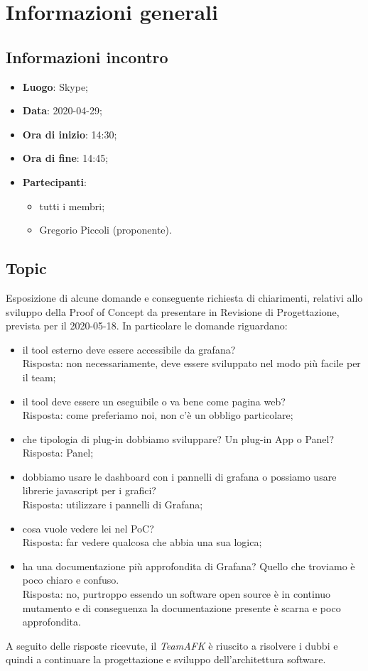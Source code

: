 \section{Informazioni generali}
\subsection{Informazioni incontro}
\begin{itemize}
\item \textbf{Luogo}: Skype;
\item \textbf{Data}: 2020-04-29;
\item \textbf{Ora di inizio}: 14:30;
\item \textbf{Ora di fine}: 14:45;
\item \textbf{Partecipanti}:
	\begin{itemize}
		\item tutti i membri;
		\item Gregorio Piccoli (proponente).
	\end{itemize}
\end{itemize}

\subsection{Topic}
Esposizione di alcune domande e conseguente richiesta di chiarimenti, relativi allo sviluppo della Proof of Concept da presentare in Revisione di Progettazione, prevista per il 2020-05-18.
In particolare le domande riguardano:
\begin{itemize}
	\item il tool esterno deve essere accessibile da grafana?\\
	Risposta: non necessariamente, deve essere sviluppato nel modo più facile per il team;
	\item il tool deve essere un eseguibile o va bene come pagina web? \\
	Risposta: come preferiamo noi, non c'è un obbligo particolare;
	\item che tipologia di plug-in dobbiamo sviluppare? Un plug-in App o Panel? \\
	Risposta: Panel;
	\item dobbiamo usare le dashboard con i pannelli di grafana o possiamo usare librerie javascript per i grafici? \\
	Risposta: utilizzare i pannelli di Grafana;
	\item cosa vuole vedere lei nel PoC? \\
	Risposta: far vedere qualcosa che abbia una sua logica;
	\item ha una documentazione più approfondita di Grafana? Quello che troviamo è poco chiaro e confuso.\\
	Risposta: no, purtroppo essendo un software open source è in continuo mutamento e di conseguenza la documentazione presente è scarna e poco approfondita.
\end{itemize}
A seguito delle risposte ricevute, il \textit{TeamAFK} è riuscito a risolvere i dubbi e quindi a continuare la progettazione e sviluppo dell'architettura software.